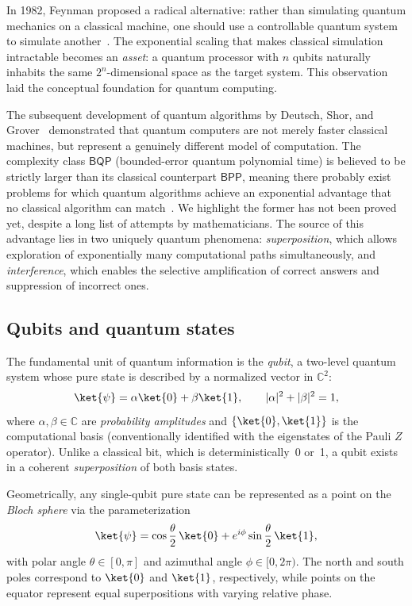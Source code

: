 In 1982, Feynman proposed a radical alternative: rather than simulating quantum
mechanics on a classical machine, one should use a controllable quantum system to
simulate another~\cite{feynman1982}. The exponential scaling that makes classical
simulation intractable becomes an \emph{asset}: a quantum processor with $n$
qubits naturally inhabits the same $2^n$-dimensional space as the target system.
This observation laid the conceptual foundation for quantum computing.

The subsequent development of quantum algorithms by Deutsch, Shor, and
Grover~\cite{nielsen2010} demonstrated that quantum computers are not merely
faster classical machines, but represent a genuinely different model of
computation. The complexity class $\mathsf{BQP}$ (bounded-error quantum
polynomial time) is believed to be strictly larger than its classical counterpart
$\mathsf{BPP}$, meaning there probably exist problems for which quantum algorithms
achieve an exponential advantage that no classical algorithm can
match~\cite{nielsen2010}. We highlight the former has not been proved yet, 
despite a long list of attempts by mathematicians. The source of this advantage lies in two uniquely
quantum phenomena: \emph{superposition}, which allows exploration of exponentially
many computational paths simultaneously, and \emph{interference}, which enables
the selective amplification of correct answers and suppression of incorrect ones.


\subsection{Qubits and quantum states}
\label{sec:qubits}

The fundamental unit of quantum information is the \emph{qubit}, a two-level
quantum system whose pure state is described by a normalized vector in
$\mathbb{C}^2$:
\begin{equation}
  \label{eq:qubit}
  \ket{\psi} = \alpha\ket{0} + \beta\ket{1},
  \qquad |\alpha|^2 + |\beta|^2 = 1,
\end{equation}
where $\alpha,\beta\in\mathbb{C}$ are \emph{probability amplitudes} and
$\{\ket{0},\ket{1}\}$ is the computational basis (conventionally identified with
the eigenstates of the Pauli $Z$ operator). Unlike a classical bit, which is
deterministically~0 or~1, a qubit exists in a coherent \emph{superposition} of
both basis states.

Geometrically, any single-qubit pure state can be represented as a point on the
\emph{Bloch sphere} via the parameterization
\begin{equation}
  \label{eq:bloch}
  \ket{\psi}
    = \cos\frac{\theta}{2}\,\ket{0}
    + e^{i\phi}\sin\frac{\theta}{2}\,\ket{1},
\end{equation}
with polar angle $\theta\in[0,\pi]$ and azimuthal angle $\phi\in[0,2\pi)$. The
north and south poles correspond to $\ket{0}$ and $\ket{1}$, respectively, while
points on the equator represent equal superpositions with varying relative phase.


